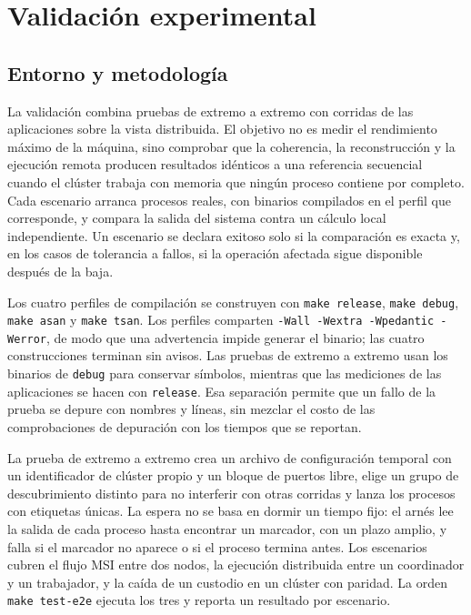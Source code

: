 \section{Validación experimental}\label{sec:validacion}

\subsection{Entorno y metodología}

La validación combina pruebas de extremo a extremo con corridas de las aplicaciones sobre la vista distribuida. El objetivo no es medir el rendimiento máximo de la máquina, sino comprobar que la coherencia, la reconstrucción y la ejecución remota producen resultados idénticos a una referencia secuencial cuando el clúster trabaja con memoria que ningún proceso contiene por completo. Cada escenario arranca procesos reales, con binarios compilados en el perfil que corresponde, y compara la salida del sistema contra un cálculo local independiente. Un escenario se declara exitoso solo si la comparación es exacta y, en los casos de tolerancia a fallos, si la operación afectada sigue disponible después de la baja.

Los cuatro perfiles de compilación se construyen con \texttt{make release}, \texttt{make debug}, \texttt{make asan} y \texttt{make tsan}. Los perfiles comparten \texttt{-Wall -Wextra -Wpedantic -Werror}, de modo que una advertencia impide generar el binario; las cuatro construcciones terminan sin avisos. Las pruebas de extremo a extremo usan los binarios de \texttt{debug} para conservar símbolos, mientras que las mediciones de las aplicaciones se hacen con \texttt{release}. Esa separación permite que un fallo de la prueba se depure con nombres y líneas, sin mezclar el costo de las comprobaciones de depuración con los tiempos que se reportan.

La prueba de extremo a extremo crea un archivo de configuración temporal con un identificador de clúster propio y un bloque de puertos libre, elige un grupo de descubrimiento distinto para no interferir con otras corridas y lanza los procesos con etiquetas únicas. La espera no se basa en dormir un tiempo fijo: el arnés lee la salida de cada proceso hasta encontrar un marcador, con un plazo amplio, y falla si el marcador no aparece o si el proceso termina antes. Los escenarios cubren el flujo MSI entre dos nodos, la ejecución distribuida entre un coordinador y un trabajador, y la caída de un custodio en un clúster con paridad. La orden \texttt{make test-e2e} ejecuta los tres y reporta un resultado por escenario.

